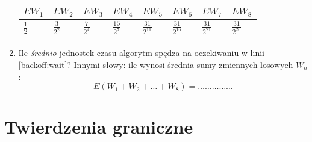 \documentclass[twoside]{mwart}
\newcommand{\ans}[1]{}
\newenvironment{ansenv}{\comment}{\endcomment}
\newenvironment{ansenv}{\paragraph{Odpowiedź:}}{}
\newcommand{\ans}[1]{\begin{ansenv}#1\end{ansenv}}
\begin{document}
\begin{enumerate}
\begin{ansenv}
\begin{tabular}{p{1.3cm}|p{1.3cm}|p{1.3cm}|p{1.3cm}|p{1.3cm}|p{1.3cm}|p{1.3cm}|p{1.3cm}}
		$EW_1$ & $EW_2$ & $EW_3$ & $EW_4$ & $EW_5$ & $EW_6$ & $EW_7$ & $EW_8$ \\
		\hline
		$\frac{1}{2}$ & $\frac{3}{2^2}$ & $\frac{7}{2^4}$ & $\frac{15}{2^7}$ & $\frac{31}{2^{11}}$ & $\frac{31}{2^{16}}$ & $\frac{31}{2^{21}}$ & $\frac{31}{2^{26}}$
	\end{tabular}
\end{ansenv}
\item Ile \emph{średnio} jednostek czasu algorytm spędza na oczekiwaniu w linii \ref{backoff:wait}?
Innymi słowy: ile wynosi średnia sumy zmiennych losowych $W_n$:
\[ E(W_1+W_2+\ldots+W_8)=\ldots\ldots\ldots\ldots\ldots\]
\ans{\[ E(W_1+W_2+\ldots+W_8) = \frac{1}{2^{26}}\left(2^{25} + 3\cdot 2^{24} + 7\cdot 2^{22} + 15\cdot 2^{19} + 31\cdot 2^{15} + 31\cdot 2^{10} + 31\cdot 2^{5} + 31 \right) \]}
\end{enumerate}

\cleardoublepage
\section{Twierdzenia graniczne}
\end{document}
